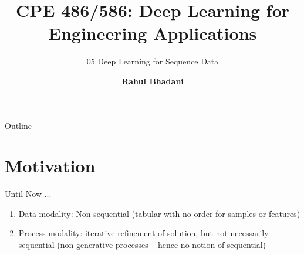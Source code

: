 \documentclass[aspectratio=169,xcolor=dvipsnames,svgnames,x11names,fleqn]{beamer}
\title[CPE 487/587: Deep Learning]{CPE 486/586: Deep Learning for Engineering Applications} %
\subtitle{05 Deep Learning for Sequence Data}
\author[Rahul Bhadani] {{\Large \textbf{Rahul Bhadani}}}
\institute[UAH] %
{
    Electrical \& Computer Engineering,  The University of Alabama in Huntsville
}
\date
\begin{document}
\begin{frame}
    \titlepage
\end{frame}

\begin{frame}{Outline}
    \backgroundtableofcontents
\end{frame}


\section{Motivation}

\begin{frame}
    \sectionpage
\end{frame}

\begin{frame}{Until Now ...}

\begin{enumerate}

\item Data modality: Non-sequential (tabular with no order for samples or features)

\item Process modality: iterative refinement of solution, but not necessarily sequential (non-generative processes -- hence no notion of sequential)


\end{enumerate}

\end{frame}
\end{document}
